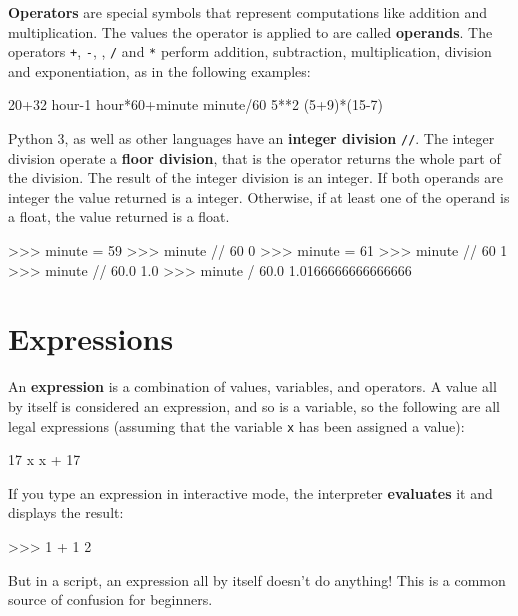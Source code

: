 {\bf Operators} are special symbols that represent computations like
addition and multiplication.  The values the operator is applied to
are called {\bf operands}.
The operators {\tt +}, {\tt -}, {\tt *}, {\tt /} and {\tt **}
perform addition, subtraction, multiplication, division and
exponentiation, as in the following examples:

\beforeverb
\begin{pyinterpreter}
20+32   hour-1   hour*60+minute   minute/60   5**2   (5+9)*(15-7)
\end{pyinterpreter}
\afterverb
%


Python 3, as well as other languages have an {\bf integer division} {\tt //}. The integer division operate a {\bf floor division}, that is the operator returns the whole part of the division. The result of the integer division  is an integer. If both operands are integer the value returned is a integer. Otherwise, if at least one of the operand is a float, the value returned is a float.

\beforeverb
\begin{pyinterpreter}
>>> minute = 59
>>> minute // 60
0
>>> minute = 61
>>> minute // 60
1
>>> minute // 60.0
1.0
>>> minute / 60.0
1.0166666666666666
\end{pyinterpreter}
\afterverb
%

\section{Expressions}

An {\bf expression} is a combination of values, variables, and operators.
A value all by itself is considered an expression, and so is
a variable, so the following are all legal expressions
(assuming that the variable {\tt x} has been assigned a value):


\beforeverb
\begin{pycode}
17
x
x + 17
\end{pycode}
\afterverb
%
If you type an expression in interactive mode, the interpreter
{\bf evaluates} it and displays the result:

\beforeverb
\begin{pyinterpreter}
>>> 1 + 1
2
\end{pyinterpreter}
\afterverb
%
But in a script, an expression all by itself doesn't
do anything!  This is a common
source of confusion for beginners.

